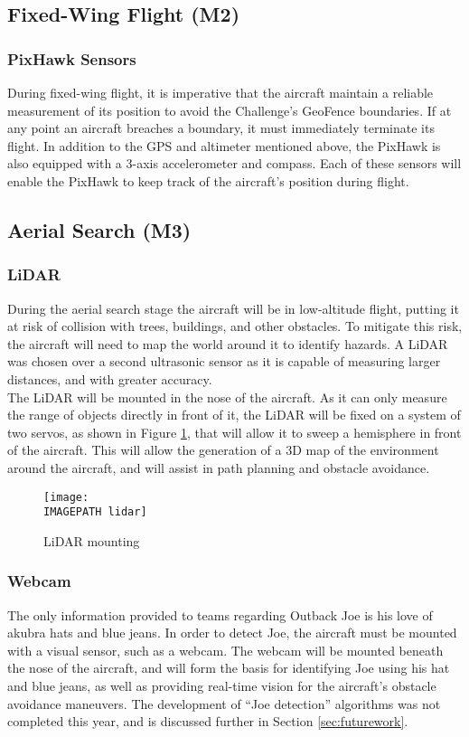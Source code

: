 \subsection{Fixed-Wing Flight (M2)}
\subsubsection*{PixHawk Sensors}
During fixed-wing flight, it is imperative that the aircraft maintain a reliable measurement of its position to avoid the Challenge's GeoFence boundaries. If at any point an aircraft breaches a boundary, it must immediately terminate its flight. In addition to the GPS and altimeter mentioned above, the PixHawk is also equipped with a 3-axis accelerometer and compass. Each of these sensors will enable the PixHawk to keep track of the aircraft's position during flight.

\subsection{Aerial Search (M3)}
\subsubsection*{LiDAR}
During the aerial search stage the aircraft will be in low-altitude flight, putting it at risk of collision with trees, buildings, and other obstacles. To mitigate this risk, the aircraft will need to map the world around it to identify hazards. A LiDAR was chosen over a second ultrasonic sensor as it is capable of measuring larger distances, and with greater accuracy.\\

The LiDAR will be mounted in the nose of the aircraft. As it can only measure the range of objects directly in front of it, the LiDAR will be fixed on a system of two servos, as shown in Figure \ref{fig:lidar}, that will allow it to sweep a hemisphere in front of the aircraft. This will allow the generation of a 3D map of the environment around the aircraft, and will assist in path planning and obstacle avoidance.

\begin{figure}[!ht]
	\centering
	\texttt{[image: \\IMAGEPATH lidar]}
	\caption{LiDAR mounting}
	\label{fig:lidar}
\end{figure}

\subsubsection*{Webcam}
The only information provided to teams regarding Outback Joe is his love of akubra hats and blue jeans. In order to detect Joe, the aircraft must be mounted with a visual sensor, such as a webcam. The webcam will be mounted beneath the nose of the aircraft, and will form the basis for identifying Joe using his hat and blue jeans, as well as providing real-time vision for the aircraft's obstacle avoidance maneuvers. The development of ``Joe detection'' algorithms was not completed this year, and is discussed further in Section \ref{sec:futurework}.

